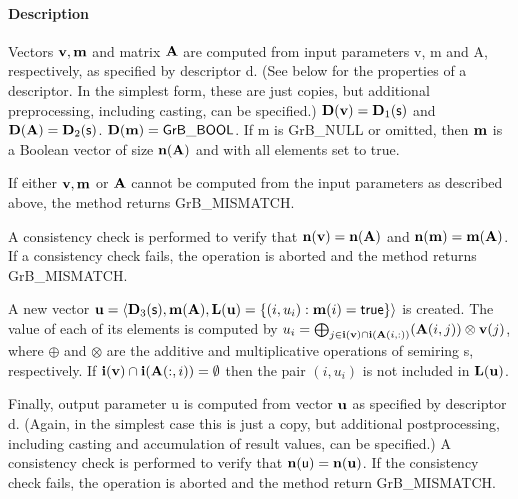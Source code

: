 \paragraph{Description}

Vectors ${\bf v}, {\bf m}$ and matrix ${\bf A}$ are computed from
input parameters {\sf v}, {\sf m} and {\sf A}, respectively, as specified
by descriptor {\sf d}. (See below for the properties of a descriptor. In
the simplest form, these are just copies, but additional preprocessing,
including casting, can be specified.)  $\bold{D}({\bf v}) =
\bold{D}_1({\sf s})$ and $\bold{D}({\bf A}) = \bold{D}_2({\sf s})$.
$\bold{D}({\bf m}) = {\sf GrB\_BOOL}$.  If {\sf m} is {\sf GrB\_NULL} or omitted,
then ${\bf m}$ is a Boolean vector of size $\bold{n}({\bf A})$
and with all elements set to {\sf true}.

If either ${\bf v}, {\bf m}$ or ${\bf A}$ cannot be computed
from the input parameters as described above, the method returns {\sf
GrB\_MISMATCH}.

A consistency check is performed to verify that $\bold{n}({\bf v})
= \bold{n}({\bf A})$ and $\bold{n}({\bf m}) =
\bold{m}({\bf A})$. If a consistency check fails, the operation is
aborted and the method returns {\sf GrB\_MISMATCH}.

A new vector ${\bf u} = \langle \bold{D}_3({\sf s}),
\bold{m}({\bf A}), \bold{L}({\bf u}) = \{(i,u_i) : {\bf m}(i)
= {\sf true} \} \rangle$ is created.  The value of each of its elements
is computed by $u_i = \bigoplus_{j \in {\bf i}({\bf v}) \cap
{\bf i}({\bf A}(i,:))} ({\bf A}(i,j)) \otimes {\bf v}(j)$,
where $\oplus$ and $\otimes$ are the additive and multiplicative
operations of semiring {\sf s}, respectively.  If ${\bf i}({\bf v})
\cap {\bf i}({\bf A}(:,i)) = \emptyset$ then the pair $(i,u_i)$
is not included in $\bold{L}({\bf u})$.

Finally, output parameter {\sf u} is computed from vector ${\bf u}$
as specified by descriptor {\sf d}. (Again, in the simplest case this
is just a copy, but additional postprocessing, including casting and
accumulation of result values, can be specified.)  A consistency check is
performed to verify that $\bold{n}({\sf u}) = \bold{n}({\bf u})$. If
the consistency check fails, the operation is aborted and the method
return {\sf GrB\_MISMATCH}.
